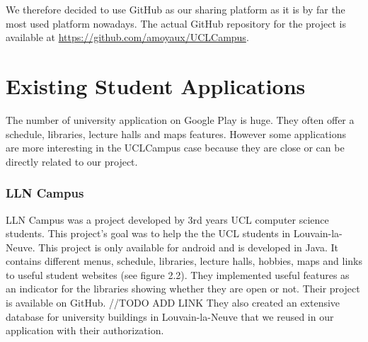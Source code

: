 \documentclass{eplmastersthesis}
\begin{document}
We therefore decided to use GitHub as our sharing platform as it is by far the most used platform nowadays.
The actual GitHub repository for the project is available at \url{https://github.com/amoyaux/UCLCampus}.


\section{Existing Student Applications}

The number of university application on Google Play is huge. They often offer a schedule, libraries, lecture halls and maps features. However some applications are more interesting in the UCLCampus case because they are close or can be directly related to our project.  

\subsubsection{LLN Campus}
LLN Campus was a project developed by 3rd years UCL computer science students. This project's goal was to help the the UCL students in Louvain-la-Neuve. This project is only available for android and is developed in Java. It contains different menus, schedule, libraries, lecture halls, hobbies, maps and links to useful student websites (see figure 2.2). They implemented useful features as an indicator for the libraries showing whether they are open or not. Their project is available on GitHub. //TODO ADD LINK They also created an extensive database for university buildings in Louvain-la-Neuve that we reused in our application with their authorization. 
\end{document}
